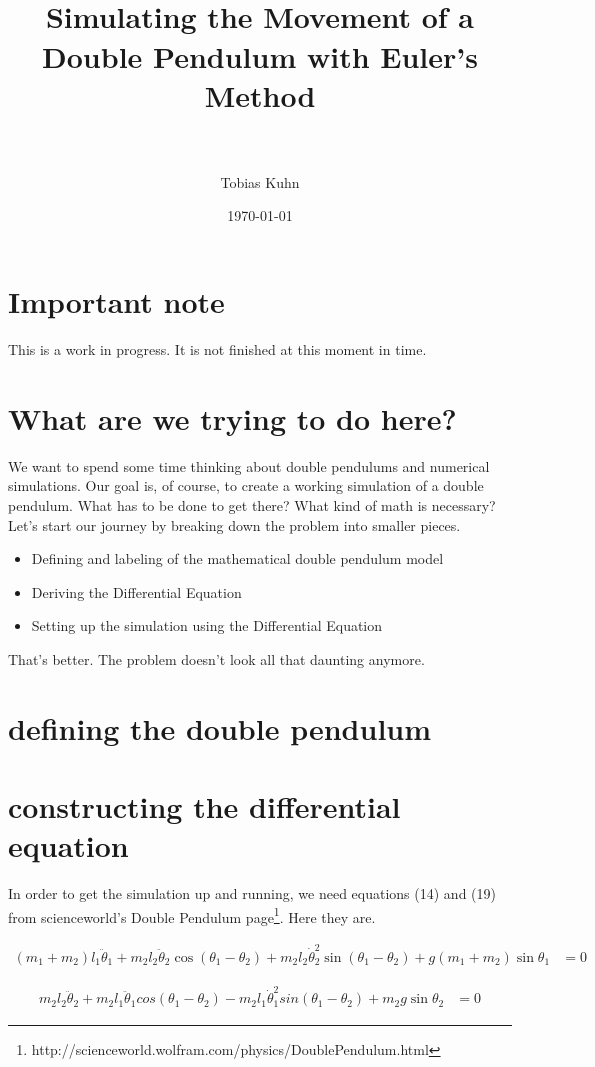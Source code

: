 \documentclass[paper=a4, fontsize=11pt]{scrartcl} %
\title{
\normalfont \normalsize 
\horrule{0.5pt} \\[0.4cm] %
\huge Simulating the Movement of a Double Pendulum with Euler's Method \\ %
\horrule{2pt} \\[0.5cm] %
}
\author{Tobias Kuhn} %
\date{\normalsize\today} %
\numberwithin{equation}{section} %
\numberwithin{figure}{section} %
\numberwithin{table}{section} %
\begin{document}
\maketitle %

\section{Important note}
This is a work in progress. It is not finished at this moment in time.

\section{What are we trying to do here?}
We want to spend some time thinking about double pendulums and numerical simulations.
Our goal is, of course, to create a working simulation of a double pendulum. 
What has to be done to get there? What kind of math is necessary?
Let's start our journey by breaking down the problem into smaller pieces.
\begin{itemize}
  \item Defining and labeling of the mathematical double pendulum model 
  \item Deriving the Differential Equation
  \item Setting up the simulation using the Differential Equation
\end{itemize}
That's better. The problem doesn't look all that daunting anymore.

\section{defining the double pendulum}

\section{constructing the differential equation}
In order to get the simulation up and running, we need equations (14) and (19) from scienceworld's Double Pendulum page\footnote{http://scienceworld.wolfram.com/physics/DoublePendulum.html}.
Here they are.

\begin{align} \label{eq:1}
(m_1 + m_2) l_1 \ddot{\theta}_1 + m_2 l_2 \ddot{\theta}_2 \cos(\theta_1 - \theta_2)
 + m_2 l_2 \dot{\theta}^2_2 \sin(\theta_1 - \theta_2) + g (m_1 + m_2) \sin \theta_1 &= 0
\end{align}

\begin{align} \label{eq:1}
  m_2 l_2 \ddot{\theta}_2 + m_2 l_1 \ddot{\theta}_1 cos(\theta_1 - \theta_2)
  - m_2 l_1 \dot{\theta}^2_1 sin(\theta_1 - \theta_2) + m_2 g \sin \theta_2 &= 0
\end{align}
\end{document}
